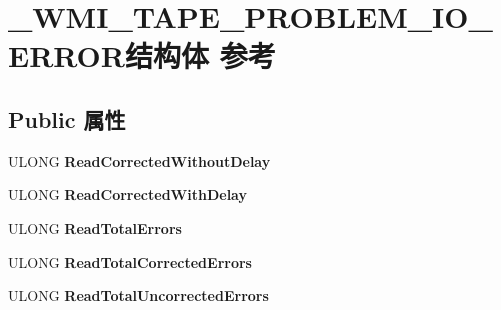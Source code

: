 \hypertarget{struct___w_m_i___t_a_p_e___p_r_o_b_l_e_m___i_o___e_r_r_o_r}{}\section{\+\_\+\+W\+M\+I\+\_\+\+T\+A\+P\+E\+\_\+\+P\+R\+O\+B\+L\+E\+M\+\_\+\+I\+O\+\_\+\+E\+R\+R\+O\+R结构体 参考}
\label{struct___w_m_i___t_a_p_e___p_r_o_b_l_e_m___i_o___e_r_r_o_r}
\subsection*{Public 属性}
\begin{DoxyCompactItemize}
\item 
\mbox{\label{struct___w_m_i___t_a_p_e___p_r_o_b_l_e_m___i_o___e_r_r_o_r_a4cf6b4a1253978686a988c167c0d11c8}} 
U\+L\+O\+NG {\bfseries Read\+Corrected\+Without\+Delay}
\item 
\mbox{\label{struct___w_m_i___t_a_p_e___p_r_o_b_l_e_m___i_o___e_r_r_o_r_a314d61d31acdb9aa1aae0db888ee5f05}} 
U\+L\+O\+NG {\bfseries Read\+Corrected\+With\+Delay}
\item 
\mbox{\label{struct___w_m_i___t_a_p_e___p_r_o_b_l_e_m___i_o___e_r_r_o_r_aba78aec037c0c0a80867059e3e2d1f7e}} 
U\+L\+O\+NG {\bfseries Read\+Total\+Errors}
\item 
\mbox{\label{struct___w_m_i___t_a_p_e___p_r_o_b_l_e_m___i_o___e_r_r_o_r_aeff75d8e03518cff2c68ea46e39afbcb}} 
U\+L\+O\+NG {\bfseries Read\+Total\+Corrected\+Errors}
\item 
\mbox{\label{struct___w_m_i___t_a_p_e___p_r_o_b_l_e_m___i_o___e_r_r_o_r_aa82fd9b46e6d204ddb310c411e4fd29b}} 
U\+L\+O\+NG {\bfseries Read\+Total\+Uncorrected\+Errors}
\item 
\mbox{\label{struct___w_m_i___t_a_p_e___p_r_o_b_l_e_m___i_o___e_r_r_o_r_a6bfeaa746362b8883e3e004604849442}} 

\end{DoxyCompactItemize}

